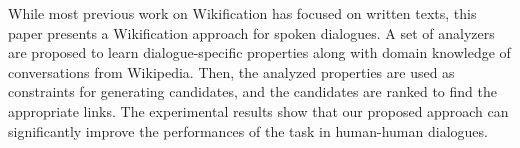 While most previous work on Wikification has focused on written texts, this paper presents a Wikification approach for spoken dialogues. A set of analyzers are proposed to learn dialogue-specific properties along with domain knowledge of conversations from Wikipedia. Then, the analyzed properties are used as constraints for generating candidates, and the candidates are ranked to find the appropriate links. The experimental results show that our proposed approach can significantly improve the performances of the task in human-human dialogues.
